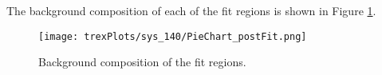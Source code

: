 The background composition of each of the fit regions is shown in Figure \ref{fig:pieChart140}.

\begin{figure}[H]
    \centering                                                                                                               
    \texttt{[image: trexPlots/sys\_140/PieChart\_postFit.png]}
    \caption{Background composition of the fit regions.}
    \label{fig:pieChart140}
\end{figure}

